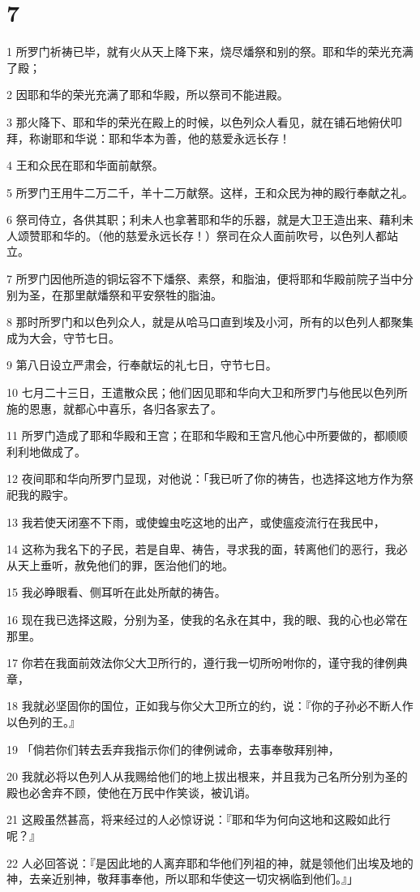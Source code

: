 \chapter{7}

\par 1 所罗门祈祷已毕，就有火从天上降下来，烧尽燔祭和别的祭。耶和华的荣光充满了殿；
\par 2 因耶和华的荣光充满了耶和华殿，所以祭司不能进殿。
\par 3 那火降下、耶和华的荣光在殿上的时候，以色列众人看见，就在铺石地俯伏叩拜，称谢耶和华说：耶和华本为善，他的慈爱永远长存！
\par 4 王和众民在耶和华面前献祭。
\par 5 所罗门王用牛二万二千，羊十二万献祭。这样，王和众民为神的殿行奉献之礼。
\par 6 祭司侍立，各供其职；利未人也拿著耶和华的乐器，就是大卫王造出来、藉利未人颂赞耶和华的。（他的慈爱永远长存！）祭司在众人面前吹号，以色列人都站立。
\par 7 所罗门因他所造的铜坛容不下燔祭、素祭，和脂油，便将耶和华殿前院子当中分别为圣，在那里献燔祭和平安祭牲的脂油。
\par 8 那时所罗门和以色列众人，就是从哈马口直到埃及小河，所有的以色列人都聚集成为大会，守节七日。
\par 9 第八日设立严肃会，行奉献坛的礼七日，守节七日。
\par 10 七月二十三日，王遣散众民；他们因见耶和华向大卫和所罗门与他民以色列所施的恩惠，就都心中喜乐，各归各家去了。
\par 11 所罗门造成了耶和华殿和王宫；在耶和华殿和王宫凡他心中所要做的，都顺顺利利地做成了。
\par 12 夜间耶和华向所罗门显现，对他说：「我已听了你的祷告，也选择这地方作为祭祀我的殿宇。
\par 13 我若使天闭塞不下雨，或使蝗虫吃这地的出产，或使瘟疫流行在我民中，
\par 14 这称为我名下的子民，若是自卑、祷告，寻求我的面，转离他们的恶行，我必从天上垂听，赦免他们的罪，医治他们的地。
\par 15 我必睁眼看、侧耳听在此处所献的祷告。
\par 16 现在我已选择这殿，分别为圣，使我的名永在其中，我的眼、我的心也必常在那里。
\par 17 你若在我面前效法你父大卫所行的，遵行我一切所吩咐你的，谨守我的律例典章，
\par 18 我就必坚固你的国位，正如我与你父大卫所立的约，说：『你的子孙必不断人作以色列的王。』
\par 19 「倘若你们转去丢弃我指示你们的律例诫命，去事奉敬拜别神，
\par 20 我就必将以色列人从我赐给他们的地上拔出根来，并且我为己名所分别为圣的殿也必舍弃不顾，使他在万民中作笑谈，被讥诮。
\par 21 这殿虽然甚高，将来经过的人必惊讶说：『耶和华为何向这地和这殿如此行呢？』
\par 22 人必回答说：『是因此地的人离弃耶和华他们列祖的神，就是领他们出埃及地的神，去亲近别神，敬拜事奉他，所以耶和华使这一切灾祸临到他们。』」

